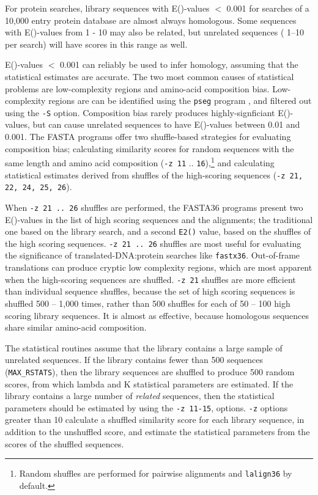 \documentclass[11pt]{article}
\begin{document}
For protein searches, library sequences with E()-values $<$ 0.001 for
searches of a 10,000 entry protein database are almost always
homologous. Some sequences with E()-values from 1 - 10 may also be
related, but unrelated sequences ( 1--10 per search) will have scores
in this range as well.

E()-values $<$ 0.001 can reliably be used to infer homology, assuming
that the statistical estimates are accurate.  The two most common
causes of statistical problems are low-complexity regions and
amino-acid composition bias.  Low-complexity regions are can be
identified using the \texttt{pseg} program \cite{woo935}, and filtered
out using the \texttt{-S} option. Composition bias rarely produces
highly-signficiant E()-values, but can cause unrelated sequences to
have E()-values between 0.01 and 0.001. The FASTA programs offer two
shuffle-based strategies for evaluating composition bias; calculating
similarity scores for random sequences with the same length and amino
acid composition (\texttt{-z 11} $..$ \texttt{16}),\footnote{Random
  shuffles are performed for pairwise alignments and \texttt{lalign36}
  by default.} and calculating statistical estimates derived from
shuffles of the high-scoring sequences (\texttt{-z 21, 22, 24, 25,
  26}).

When \texttt{-z 21 .. 26} shuffles are performed, the FASTA36 programs
present two E()-values in the list of high scoring sequences and the
alignments; the traditional one based on the library search, and a
second \texttt{E2()} value, based on the shuffles of the high scoring
sequences.  \texttt{-z 21 .. 26} shuffles are most useful for
evaluating the significance of translated-DNA:protein searches like
\texttt{fastx36}.  Out-of-frame translations can produce cryptic low
complexity regions, which are most apparent when the high-scoring
sequences are shuffled.  \texttt{-z 21} shuffles are more efficient
than individual sequence shuffles, because the set of high scoring
sequences is shuffled 500 -- 1,000 times, rather than 500 shuffles for
each of 50 -- 100 high scoring library sequences.  It is almost as
effective, because homologous sequences share similar amino-acid
composition.

The statistical routines assume that the library contains a large
sample of unrelated sequences.  If the library contains fewer than
500 sequences (\texttt{MAX\_RSTATS}), then the library sequences are
shuffled to produce 500 random scores, from which lambda and K
statistical parameters are estimated. If the library contains a large
number of \emph{related} sequences, then the statistical parameters
should be estimated by using the \texttt{-z 11-15}, options.
\texttt{-z} options greater than 10 calculate a shuffled similarity
score for each library sequence, in addition to the unshuffled score,
and estimate the statistical parameters from the scores of the
shuffled sequences.
\end{document}

